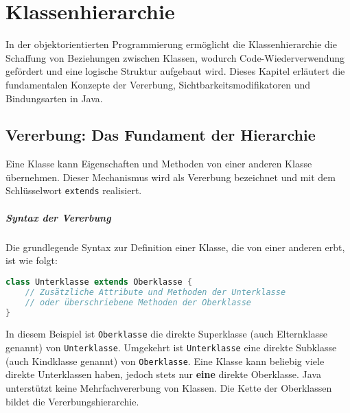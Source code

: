 \chapter{Klassenhierarchie}
\label{chap:klassenhierarchie}

In der objektorientierten Programmierung ermöglicht die Klassenhierarchie die Schaffung von Beziehungen zwischen Klassen, 
wodurch Code-Wiederverwendung gefördert und eine logische Struktur aufgebaut wird. Dieses Kapitel erläutert die fundamentalen 
Konzepte der Vererbung, Sichtbarkeitsmodifikatoren und Bindungsarten in Java.

\section{Vererbung: Das Fundament der Hierarchie}
\label{sec:erben}

Eine Klasse kann Eigenschaften und Methoden von einer anderen Klasse übernehmen. Dieser Mechanismus wird als Vererbung bezeichnet 
und mit dem Schlüsselwort \texttt{extends} realisiert.

\paragraph{Syntax der Vererbung}
Die grundlegende Syntax zur Definition einer Klasse, die von einer anderen erbt, ist wie folgt:
\begin{lstlisting}[language=Java, caption={Deklaration einer abgeleiteten Klasse}]
class Unterklasse extends Oberklasse {
    // Zusätzliche Attribute und Methoden der Unterklasse
    // oder überschriebene Methoden der Oberklasse
}
\end{lstlisting}
In diesem Beispiel ist \texttt{Oberklasse} die direkte Superklasse (auch Elternklasse genannt) von \texttt{Unterklasse}. Umgekehrt ist 
\texttt{Unterklasse} eine direkte Subklasse (auch Kindklasse genannt) von \texttt{Oberklasse}. Eine Klasse kann beliebig viele direkte 
Unterklassen haben, jedoch stets nur \textbf{eine} direkte Oberklasse. Java unterstützt keine Mehrfachvererbung von Klassen. Die Kette 
der Oberklassen bildet die Vererbungshierarchie.

